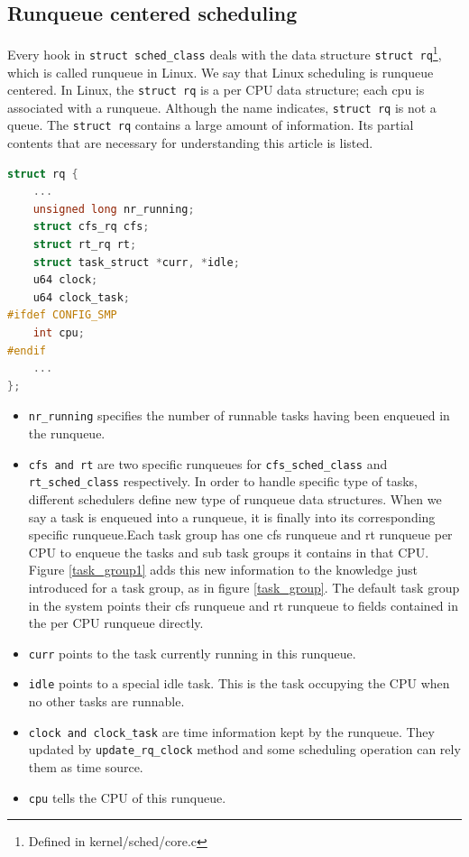 \subsection{Runqueue centered scheduling\label{LinuxSched_rq}}
Every hook in \texttt{struct sched\_class} deals with the data structure 
\texttt{struct rq}\footnote{Defined in kernel/sched/core.c}, which is called 
runqueue in Linux.  We say that 
Linux scheduling is runqueue centered. In Linux, the \texttt{struct rq} is 
a per CPU data structure; each cpu is associated with a runqueue. Although 
the name indicates, \texttt{struct rq} is not a queue. The \texttt{struct rq}
contains a large amount of information. Its partial contents that are
necessary for understanding this article is listed.
\begin{lstlisting}[language=C,
			caption={\texttt{The runqueue structure}},
			label={runqueue}]
struct rq {
	...
	unsigned long nr_running;
	struct cfs_rq cfs;
	struct rt_rq rt;
	struct task_struct *curr, *idle;
	u64 clock;
	u64 clock_task;
#ifdef CONFIG_SMP
	int cpu;
#endif
	...
};
\end{lstlisting}
\begin{itemize}
\item \texttt{nr\_running} specifies the number of runnable tasks 
	having been enqueued in the runqueue.
\item \texttt{cfs and rt} are two specific runqueues for 
	\texttt{cfs\_sched\_class} and \texttt{rt\_sched\_class} respectively. 
	In order to handle specific type of tasks, different schedulers define 
	new type of runqueue data structures. 
	When we say a task is enqueued into a runqueue, it is finally into
	its corresponding specific runqueue.Each task group has one cfs 
	runqueue and rt runqueue per CPU to enqueue the tasks and sub task
	groups it contains in that CPU. 
	Figure \ref{task_group1} adds this new information to the
	knowledge just introduced for a task group, as in 
	figure \ref{task_group}. The default task group in the system points
	their cfs runqueue and rt runqueue to fields contained in the
	per CPU runqueue directly. 
\item \texttt{curr} points to the task currently running in this runqueue.
\item \texttt{idle} points to a special idle task. This is the task occupying
		the CPU  when no other tasks are runnable.
\item \texttt{clock and clock\_task} are time information kept by the runqueue.
	They updated by \texttt{update\_rq\_clock} method and some scheduling
	operation can rely them as time source.
\item \texttt{cpu} tells the CPU of this runqueue.
\end{itemize}

